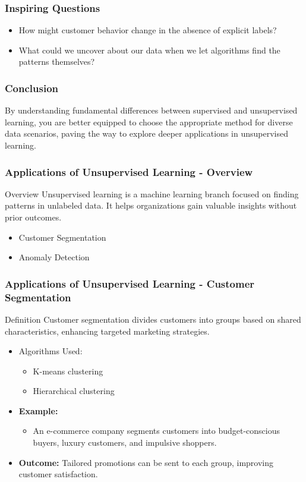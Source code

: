 \documentclass[aspectratio=169]{beamer}
\begin{document}
\begin{frame}[fragile]
    \frametitle{Inspiring Questions}
    \begin{itemize}
        \item How might customer behavior change in the absence of explicit labels?
        \item What could we uncover about our data when we let algorithms find the patterns themselves?
    \end{itemize}
\end{frame}

\begin{frame}[fragile]
    \frametitle{Conclusion}
    By understanding fundamental differences between supervised and unsupervised learning, you are better equipped to choose the appropriate method for diverse data scenarios, paving the way to explore deeper applications in unsupervised learning.
\end{frame}

\begin{frame}[fragile]
  \frametitle{Applications of Unsupervised Learning - Overview}
  \begin{block}{Overview}
    Unsupervised learning is a machine learning branch focused on finding patterns in unlabeled data. It helps organizations gain valuable insights without prior outcomes.
  \end{block}
  \begin{itemize}
    \item Customer Segmentation
    \item Anomaly Detection
  \end{itemize}
\end{frame}

\begin{frame}[fragile]
  \frametitle{Applications of Unsupervised Learning - Customer Segmentation}
  \begin{block}{Definition}
    Customer segmentation divides customers into groups based on shared characteristics, enhancing targeted marketing strategies.
  \end{block}
  
  \begin{itemize}
    \item Algorithms Used:
    \begin{itemize}
        \item K-means clustering
        \item Hierarchical clustering
    \end{itemize}
    \item \textbf{Example:}
    \begin{itemize}
        \item An e-commerce company segments customers into budget-conscious buyers, luxury customers, and impulsive shoppers.
    \end{itemize}
    \item \textbf{Outcome:} Tailored promotions can be sent to each group, improving customer satisfaction.
  \end{itemize}
\end{frame}
\end{document}
